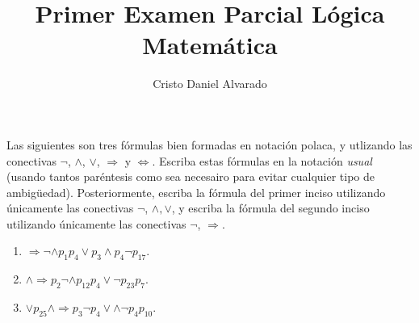 \documentclass[12pt]{article}
\newcounter{it}
\theoremstyle{largebreak}
\begin{document}
    \setlength{\parskip}{5pt} %
    \setlength{\parindent}{12pt} %
    \title{Primer Examen Parcial Lógica Matemática}
    \author{Cristo Daniel Alvarado}
    \maketitle

    \begin{excer}
        Las siguientes son tres fórmulas bien formadas en notación polaca, y utlizando las conectivas $\neg$, $\land$, $\lor$, $\Rightarrow$ y $\iff$. Escriba estas fórmulas en la notación \textit{usual} (usando tantos paréntesis como sea necesairo para evitar cualquier tipo de ambigüedad). Posteriormente, escriba la fórmula del primer inciso utilizando únicamente las conectivas $\neg$, $\land,\lor$, y escriba la fórmula del segundo inciso utilizando únicamente las conectivas $\neg$, $\Rightarrow$.
        \begin{enumerate}[label = \textit{(\alph*)}]
            \item $\Rightarrow\neg\land p_1p_4\lor p_3\land p_4\neg p_{17}$.
            \item $\land\Rightarrow p_2\neg\land p_{12}p_4\lor\neg p_{ 23}p_7$.
            \item $\lor p_{ 25}\land\Rightarrow p_3\neg p_4\lor\land\neg p_4p_{10}$.
        \end{enumerate}
    \end{excer}
\end{document}
